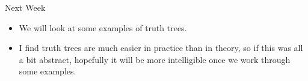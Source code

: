 \documentclass[
  ignorenonframetext,
]{beamer}
\providecommand{\tightlist}{%
  \setlength{\itemsep}{0pt}\setlength{\parskip}{0pt}}
\renewcommand{\,}{\text{, }}
\begin{document}
\begin{frame}{Next Week}
\protect\hypertarget{next-week}{}
\begin{itemize}
\tightlist
\item
  We will look at some examples of truth trees.
\item
  I find truth trees are much easier in practice than in theory, so if
  this was all a bit abstract, hopefully it will be more intelligible
  once we work through some examples.
\end{itemize}
\end{frame}
\end{document}
